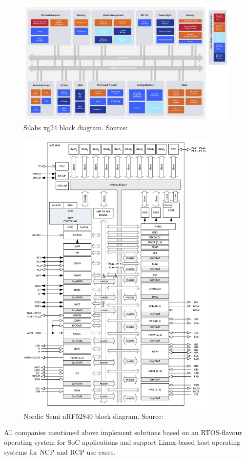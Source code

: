 \begin{figure}
    \centering
    \includegraphics[width=120mm, keepaspectratio]{figures/silabs_xg24-block-diagram.png}
    \caption{Silabs xg24 block diagram. Source: \cite{mg24}}
    \label{fig:mp:silabs-dia}
\end{figure}

\begin{figure}
    \centering
    \includegraphics[width=100mm, keepaspectratio]{figures/nordic_nRF52840-block_dia.png}
    \caption{Nordic Semi nRF52840 block diagram. Source: \cite{nordic_semi}}
    \label{fig:mp:nordic-dia}
\end{figure}

All companies mentioned above implement solutions based on an RTOS-flavour operating system for SoC applications and support Linux-based host operating systems for NCP and RCP use cases.